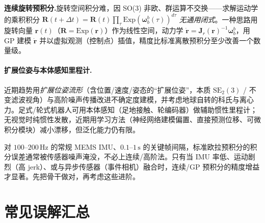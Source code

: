\textbf{连续旋转预积分.}\;旋转空间积分难，因 SO(3) 非欧、群运算不交换——求解运动学的乘积积分 $\mathbf R(t{+}\Delta t)=\mathbf R(t)\prod_{\tau}\mathrm{Exp}(\boldsymbol\omega_b^b(\tau))^{d\tau}$ \emph{无通用闭式}\cite{carlone2026handbook}。一种思路用旋转向量 $\mathbf r(t)$（$\mathbf R=\mathrm{Exp}(\mathbf r)$）作为线性空间，动力学 $\dot{\mathbf r}=\mathbf J_r(\mathbf r)^{-1}\boldsymbol\omega_b^b$，用 GP 建模 $\dot{\mathbf r}$ 并以虚拟观测（控制点）插值，精度比标准离散预积分至少改善一个数量级。

\paragraph{扩展位姿与本体感知里程计.}
近期趋势用\emph{扩展位姿流形}（含位置/速度/姿态的“扩展位姿”，本质 $\mathrm{SE}_2(3)$ / 不变滤波视角）与高阶噪声传播改进不确定度建模，并考虑地球自转的科氏与离心力。足式/轮式机器人可用本体感知（足地接触、轮编码器）做辅助惯性里程计；无视觉时纯惯性发散，近期用学习方法（神经网络建模偏置、直接预测位移、可微积分模块）减小漂移，但泛化能力仍有限\cite{carlone2026handbook}。

\begin{insight}[什么时候需要超越欧拉预积分]\label{ins:beyond-euler}
对 $100$--$200\,\mathrm{Hz}$ 的常规 MEMS IMU、$0.1$--$1\,\mathrm s$ 的关键帧间隔，标准欧拉预积分的积分误差通常被传感器噪声淹没，不必上连续/高阶法。只有当 IMU 率低、运动剧烈（高 jerk）、或与异步传感器（事件相机）融合时，连续/GP 预积分的精度增益才显著。先把骨干做对，再考虑这些进阶。
\end{insight}

\section*{常见误解汇总}

